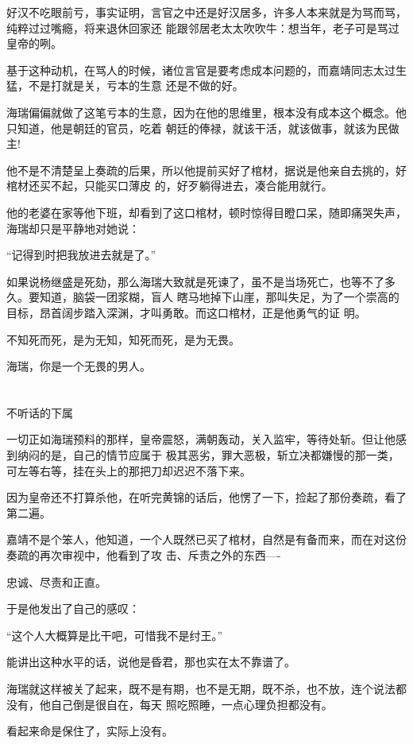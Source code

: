 \documentclass[11pt,a4paper,onecolumn]{article}
\begin{document}
好汉不吃眼前亏，事实证明，言官之中还是好汉居多，许多人本来就是为骂而骂，纯粹过过嘴瘾，将来退休回家还
能跟邻居老太太吹吹牛：想当年，老子可是骂过皇帝的咧。

基于这种动机，在骂人的时候，诸位言官是要考虑成本问题的，而嘉靖同志太过生猛，不是打就是关，亏本的生意
还是不做的好。

海瑞偏偏就做了这笔亏本的生意，因为在他的思维里，根本没有成本这个概念。他只知道，他是朝廷的官员，吃着
朝廷的俸禄，就该干活，就该做事，就该为民做主!

他不是不清楚呈上奏疏的后果，所以他提前买好了棺材，据说是他亲自去挑的，好棺材还买不起，只能买口薄皮
的，好歹躺得进去，凑合能用就行。

他的老婆在家等他下班，却看到了这口棺材，顿时惊得目瞪口呆，随即痛哭失声，海瑞却只是平静地对她说：

``记得到时把我放进去就是了。''

如果说杨继盛是死劾，那么海瑞大致就是死谏了，虽不是当场死亡，也等不了多久。要知道，脑袋一团浆糊，盲人
瞎马地掉下山崖，那叫失足，为了一个崇高的目标，昂首阔步踏入深渊，才叫勇敢。而这口棺材，正是他勇气的证
明。

不知死而死，是为无知，知死而死，是为无畏。

海瑞，你是一个无畏的男人。

\section[\thesection]{}

不听话的下属

一切正如海瑞预料的那样，皇帝震怒，满朝轰动，关入监牢，等待处斩。但让他感到纳闷的是，自己的情节应属于
极其恶劣，罪大恶极，斩立决都嫌慢的那一类，可左等右等，挂在头上的那把刀却迟迟不落下来。

因为皇帝还不打算杀他，在听完黄锦的话后，他愣了一下，捡起了那份奏疏，看了第二遍。

嘉靖不是个笨人，他知道，一个人既然已买了棺材，自然是有备而来，而在对这份奏疏的再次审视中，他看到了攻
击、斥责之外的东西----

忠诚、尽责和正直。

于是他发出了自己的感叹：

``这个人大概算是比干吧，可惜我不是纣王。''

能讲出这种水平的话，说他是昏君，那也实在太不靠谱了。

海瑞就这样被关了起来，既不是有期，也不是无期，既不杀，也不放，连个说法都没有，他自己倒是很自在，每天
照吃照睡，一点心理负担都没有。

看起来命是保住了，实际上没有。
\end{document}
